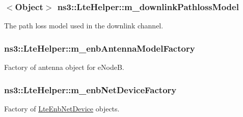 \subsubsection[{\texorpdfstring{m\+\_\+downlink\+Pathloss\+Model}{m_downlinkPathlossModel}}]{$<${\bf Object}$>$ ns3\+::\+Lte\+Helper\+::m\+\_\+downlink\+Pathloss\+Model\hspace{0.3cm}{\ttfamily [private]}}\hypertarget{classns3_1_1LteHelper_ab60aa166b387a0ed56d54ff7db31b0f0}{}\label{classns3_1_1LteHelper_ab60aa166b387a0ed56d54ff7db31b0f0}


The path loss model used in the downlink channel. 

\subsubsection[{\texorpdfstring{m\+\_\+enb\+Antenna\+Model\+Factory}{m_enbAntennaModelFactory}}]{ ns3\+::\+Lte\+Helper\+::m\+\_\+enb\+Antenna\+Model\+Factory\hspace{0.3cm}{\ttfamily [private]}}\hypertarget{classns3_1_1LteHelper_af5ae4f0a3c7ea76ee9cdb2a13a7b296c}{}\label{classns3_1_1LteHelper_af5ae4f0a3c7ea76ee9cdb2a13a7b296c}


Factory of antenna object for e\+NodeB. 

\subsubsection[{\texorpdfstring{m\+\_\+enb\+Net\+Device\+Factory}{m_enbNetDeviceFactory}}]{ ns3\+::\+Lte\+Helper\+::m\+\_\+enb\+Net\+Device\+Factory\hspace{0.3cm}{\ttfamily [private]}}\hypertarget{classns3_1_1LteHelper_a9c0c99089bff0702be00c782cb1f0aa6}{}\label{classns3_1_1LteHelper_a9c0c99089bff0702be00c782cb1f0aa6}


Factory of \hyperlink{classns3_1_1LteEnbNetDevice}{Lte\+Enb\+Net\+Device} objects. 

